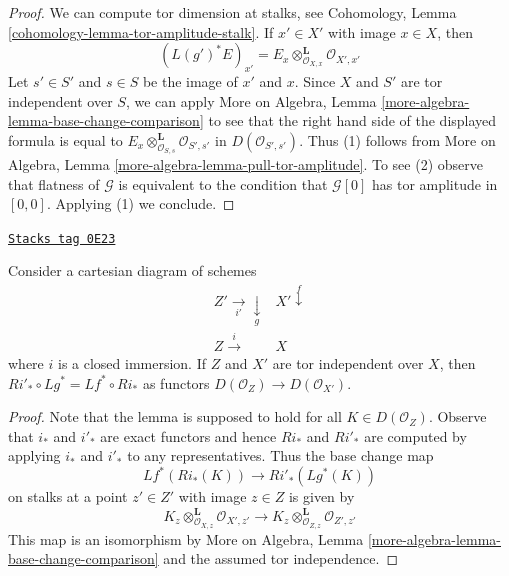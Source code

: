 \begin{proof}
We can compute tor dimension at stalks, see
Cohomology, Lemma \ref{cohomology-lemma-tor-amplitude-stalk}.
If $x' \in X'$ with image $x \in X$, then
$$
(L(g')^*E)_{x'} =
E_x \otimes_{\mathcal{O}_{X, x}}^\mathbf{L} \mathcal{O}_{X', x'}
$$
Let $s' \in S'$ and $s \in S$ be the image of $x'$ and $x$.
Since $X$ and $S'$ are tor independent over $S$, we can apply
More on Algebra, Lemma \ref{more-algebra-lemma-base-change-comparison}
to see that the right hand side of the displayed formula is equal to
$E_x \otimes_{\mathcal{O}_{S, s}}^\mathbf{L} \mathcal{O}_{S', s'}$
in $D(\mathcal{O}_{S', s'})$.
Thus (1) follows from
More on Algebra, Lemma \ref{more-algebra-lemma-pull-tor-amplitude}.
To see (2) observe that flatness of $\mathcal{G}$ is equivalent to
the condition that $\mathcal{G}[0]$ has tor amplitude in $[0, 0]$.
Applying (1) we conclude.
\end{proof}

\begin{lemma}
\label{perfect-lemma-compare-base-change-closed-immersion}
\href{https://stacks.math.columbia.edu/tag/0E23}{\texttt{Stacks tag 0E23}}

Consider a cartesian diagram of schemes
$$
\begin{array}{cc}Z' \underset{i'}{\longrightarrow}\underset{g}{\downarrow} & X' \overset{f}{\downarrow} \\ Z \overset{i}{\longrightarrow} & X\end{array}
$$
where $i$ is a closed immersion. If $Z$ and $X'$ are
tor independent over $X$, then $Ri'_* \circ Lg^* = Lf^* \circ Ri_*$
as functors $D(\mathcal{O}_Z) \to D(\mathcal{O}_{X'})$.
\end{lemma}

\begin{proof}
Note that the lemma is supposed to hold for all $K \in D(\mathcal{O}_Z)$.
Observe that $i_*$ and $i'_*$ are exact functors and hence
$Ri_*$ and $Ri'_*$ are computed by applying $i_*$ and $i'_*$
to any representatives. Thus the base change map
$$
Lf^*(Ri_*(K)) \longrightarrow Ri'_*(Lg^*(K))
$$
on stalks at a point $z' \in Z'$ with image $z \in Z$ is given by
$$
K_z \otimes_{\mathcal{O}_{X, z}}^\mathbf{L} \mathcal{O}_{X', z'}
\longrightarrow
K_z \otimes_{\mathcal{O}_{Z, z}}^\mathbf{L} \mathcal{O}_{Z', z'}
$$
This map is an isomorphism by
More on Algebra, Lemma \ref{more-algebra-lemma-base-change-comparison}
and the assumed tor independence.
\end{proof}

